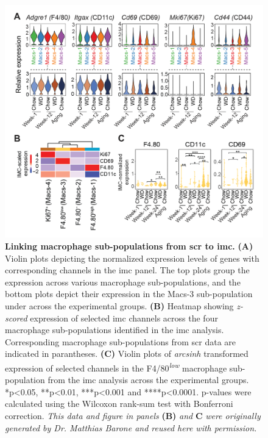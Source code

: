 \begin{figure}[t!]
\centering
\includegraphics[width=\linewidth]{Chapter4/Fig/F2-4-01.png}
\caption[Linking macrophage sub-populations from  to ]{\textbf{Linking macrophage sub-populations from \gls{scr} to \gls{imc}.} \textbf{(A)} Violin plots depicting the normalized expression levels of genes with corresponding channels in the \gls{imc} panel. The top plots group the expression across various macrophage sub-populations, and the bottom plots depict their expression in the Macs-3 sub-population under across the experimental groups. \textbf{(B)} Heatmap showing \textit{z-scored} expression of selected \gls{imc} channels across the four macrophage sub-populations identified in the \gls{imc} analysis. Corresponding macrophage sub-populations from \gls{scr} data are indicated in parantheses. \textbf{(C)} Violin plots of \textit{arcsinh} transformed expression of selected channels in the F4/80\textsuperscript{\textit{low}} macrophage sub-population from the \gls{imc} analysis across the experimental groups. *p<0.05, **p<0.01, ***p<0.001 and ****p<0.0001. p-values were calculated using the Wilcoxon rank-sum test with Bonferroni correction. \textit{This data and figure in panels} \textbf{(B)} \textit{and} \textbf{C} \textit{were originally generated by Dr. Matthias Barone and reused here with permission.}}
\label{fig:chp2_scrna_macrophages_imc}
\end{figure}


